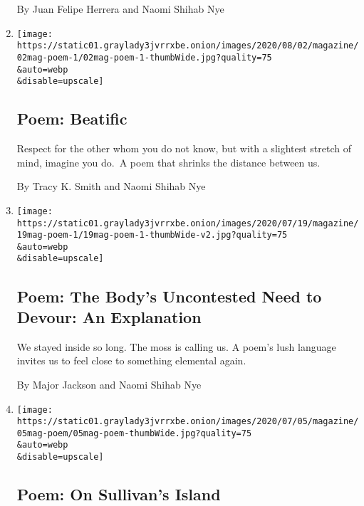 \begin{enumerate}
  By Juan Felipe Herrera and Naomi Shihab Nye
\item
  \href{/2020/07/30/magazine/poem-beatific.html}{}

  \texttt{[image: https://static01.graylady3jvrrxbe.onion/images/2020/08/02/magazine/02mag-poem-1/02mag-poem-1-thumbWide.jpg?quality=75\\\&auto=webp\\\&disable=upscale]}

  \hypertarget{poem-beatific}{%
  \subsection{Poem: Beatific}\label{poem-beatific}}

  Respect for the other whom you do not know, but with a slightest
  stretch of mind, imagine you do.~A poem that shrinks the distance
  between us.

  By Tracy K. Smith and Naomi Shihab Nye
\item
  \href{/2020/07/16/magazine/poem-the-bodys-uncontested-need-to-devour-an-explanation.html}{}

  \texttt{[image: https://static01.graylady3jvrrxbe.onion/images/2020/07/19/magazine/19mag-poem-1/19mag-poem-1-thumbWide-v2.jpg?quality=75\\\&auto=webp\\\&disable=upscale]}

  \hypertarget{poem-the-bodys-uncontested-need-to-devour-an-explanation}{%
  \subsection{Poem: The Body's Uncontested Need to Devour: An
  Explanation}\label{poem-the-bodys-uncontested-need-to-devour-an-explanation}}

  We stayed inside so long. The moss is calling us. A poem's lush
  language invites us to feel close to something elemental again.

  By Major Jackson and Naomi Shihab Nye
\item
  \href{/2020/07/02/magazine/poem-on-sullivans-island.html}{}

  \texttt{[image: https://static01.graylady3jvrrxbe.onion/images/2020/07/05/magazine/05mag-poem/05mag-poem-thumbWide.jpg?quality=75\\\&auto=webp\\\&disable=upscale]}

  \hypertarget{poem-on-sullivans-island}{%
  \subsection{Poem: On Sullivan's
  Island}\label{poem-on-sullivans-island}}


\end{enumerate}
